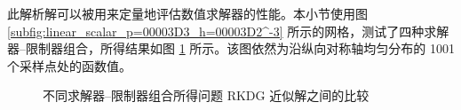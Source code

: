 此解析解可以被用来定量地评估数值求解器的性能。本小节使用图 \ref{subfig:linear_scalar_p=00003D3_h=00003D2^-3}
所示的网格，测试了四种求解器–限制器组合，所得结果如图 \ref{fig:linear_double_wave_sample} 所示。该图依然为沿纵向对称轴均匀分布的
1001 个采样点处的函数值。

\begin{figure}[h!]
\begin{centering}
\par\end{centering}
\caption{\label{fig:linear_double_wave_sample}不同求解器–限制器组合所得问题
RKDG 近似解之间的比较}
\end{figure}

\newpage{}

